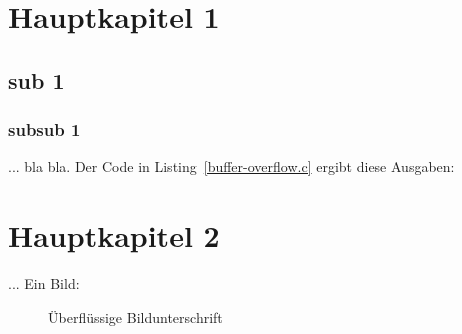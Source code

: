 \section{Hauptkapitel 1}
\subsection{sub 1}
\subsubsection{subsub 1}
... bla bla. Der Code in Listing~\ref{buffer-overflow.c} ergibt diese Ausgaben:

\section{Hauptkapitel 2}
... Ein Bild:

\begin{figure}[h]
  \caption{Überflüssige Bildunterschrift}\label{img-sample}
\end{figure}
